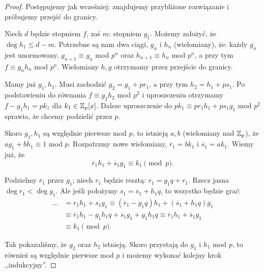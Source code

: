 \begin{proof}
	Postępujemy jak wcześniej: znajdujemy przybliżone rozwiązanie i próbujemy przejść do granicy. 

	Niech $d$ będzie stopniem $f$, zaś $m$: stopniem $g_1$.
	Możemy założyć, że $\deg h_1 \le d - m$.
	Potrzebne są nam dwa ciągi, $g_n$ i $h_n$ (wielomiany), że: każdy $g_n$ jest unormowany, $g_{n+1} \equiv g_n$ mod $p^n$ oraz $h_{n+1} \equiv h_n$ mod $p^n$, a przy tym $f \equiv g_n h_n$ mod $p^n$.
	Wielomiany $h, g$ otrzymamy przez przejście do granicy.

	Mamy już $g_1, h_1$.
	Musi zachodzić $g_2 = g_1 + pr_1$, a przy tym $h_2 = h_1 + ps_1$.
	Po podstawieniu do równania $f \equiv g_2h_2$ mod $p^2$ i uproszczeniu otrzymamy $f - g_1 h_1 = pk_1$ dla $k_1 \in \mathbb Z_p[x]$.
	Dalsze uproszczenie do $p k_1 \equiv pr_1 h_1 + p s_1 g_1$ mod ${p^2}$ sprawia, że chcemy podzielić przez $p$.

	Skoro $g_1, h_1$ są względnie pierwsze mod $p$, to istnieją $a, b$ (wielomiany nad $\mathbb Z_p$), że $ag_1 + bh_1 \equiv 1$ mod $p$.
	Rozpatrzmy nowe wielomiany, $\overline r_1 = bk_1$ i $\overline s_1 = ak_1$.
	Wiemy już, że
	\[
		\overline r_1 h_1 + \overline s_1 g_1 \equiv k_1 \pmod p.
	\]

	Podzielmy $\overline r_1$ przez $g_1$; niech $r_1$ będzie resztą: $r_1 = g_1 q + r_1$.
	Rzecz jasna $\deg r_1 < \deg g_1$.
	Ale jeśli położymy $s_1 = \overline s_1 + h_1q$, to wszystko będzie grać:
	\begin{align*}
	\ldots & = r_1 h_1 + s_1 g_1
	\equiv (\overline r_1 - g_1 q)h_1 + (\overline s_1 + h_1 q)g_1 \\
	& \equiv \overline r_1 h_1 - g_1 h_1 q + \overline s_1 g_1 + g_1 h_1 q
	\equiv \overline r_1 h_1 + \overline s_1 g_1 \\
	& \equiv k_1 \pmod p.
	\end{align*}

	Tak pokazaliśmy, że $g_2$ oraz $h_2$ istnieją.
	Skoro przystają do $g_1$ i $h_1$ mod $p$, to również są względnie pierwsze mod $p$ i możemy wykonać kolejny krok ,,indukcyjny''.
\end{proof}
